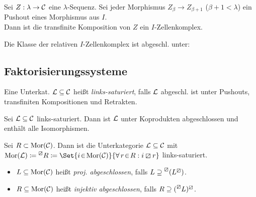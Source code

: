 \documentclass{cheat-sheet}
\newcommand{\lhhe}{\boxslash} %
\begin{document}
\begin{samepage}
\begin{lem}
  Sei $Z : \lambda \to \mathcal{C}$ eine $\lambda$-Sequenz.
  Sei jeder Morphismus $Z_\beta \to Z_{\beta + 1}$ ($\beta + 1 < \lambda$) ein Pushout eines Morphismus aus $I$. \\
  Dann ist die transfinite Komposition von $Z$ ein $I$-Zellenkomplex.
\end{lem}

\begin{thm}
  Die Klasse der relativen $I$-Zellenkomplex ist abgeschl. unter: \\
   \enspace
   \enspace
\end{thm}

\subsection{Faktorisierungssysteme}
\end{samepage}

\begin{defn}
  Eine Unterkat. $\mathcal{L} \subseteq \mathcal{C}$ heißt \emph{links-saturiert}, falls $\mathcal{L}$ abgeschl. ist unter Pushouts, transfiniten Kompositionen und Retrakten.
\end{defn}

\begin{lem}
  Sei $\mathcal{L} \subseteq \mathcal{C}$ links-saturiert. Dann ist $\mathcal{L}$ unter Koprodukten abgeschlossen und enthält alle Isomorphismen.
\end{lem}

\begin{bsp}
  Sei $R \subset \operatorname{Mor}(\mathcal{C})$. Dann ist die Unterkategorie $\mathcal{L} \subseteq \mathcal{C}$ mit
  $\Mor(\Lat) \coloneqq \prescript{\lhhe}{} R \coloneqq \Set{i \!\in\! \Mor(\Cat)}{\fa{r \!\in\! R\!}\! i \lhhe r}$
  links-saturiert.
\end{bsp}


\iffalse
\begin{prop}
  Für $L_1 \subseteq L_2 \subseteq \Mor(\Cat)$ gilt $L_1^\lhhe \leq L_2^\lhhe$.
\end{prop}
\fi

\begin{defn}
  \begin{itemize}
    \item $L \subseteq \operatorname{Mor}(\mathcal{C})$ heißt \emph{proj. abgeschlossen}, falls $L \supseteq \prescript{\lhhe}{} (L^\lhhe)$.
    \item $R \subseteq \operatorname{Mor}(\mathcal{C})$ heißt \emph{injektiv abgeschlossen}, falls $R \supseteq (\prescript{\lhhe}{} L)^\lhhe$.
  \end{itemize}
\end{defn}
\end{document}
